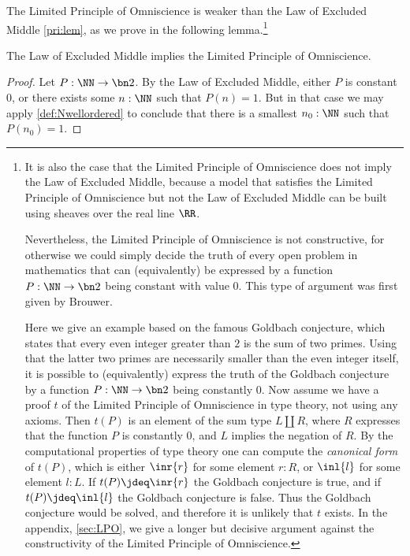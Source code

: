 The Limited Principle of Omniscience is weaker than the Law of Excluded Middle \cref{pri:lem}, as we prove in the following lemma.\footnote{%
  It is also the case that the Limited Principle of Omniscience does not imply the Law of Excluded Middle, because
  a model that satisfies the Limited Principle of Omniscience but not the Law of Excluded Middle can be built using sheaves over the real line $\RR$.

  Nevertheless, the Limited Principle of Omniscience is not constructive,
  for otherwise we could simply decide the truth of every open problem in mathematics
  that can (equivalently) be expressed by a function $P:\NN\to\bn 2$ being constant with value $0$.
  This type of argument was first given by Brouwer. %

  Here we give an example based on the famous Goldbach conjecture,
  which states that every even integer greater than $2$ is the sum of two primes. Using that
  the latter two primes are necessarily smaller than the even integer itself, it is possible
  to (equivalently) express the truth of the Goldbach conjecture by a function $P:\NN\to\bn 2$
  being constantly $0$. Now assume we have a proof $t$ of the Limited Principle of Omniscience
  in type theory, not using any axioms. Then $t(P)$ is an element of the
  sum type $L\amalg R$, where $R$ expresses that the function $P$ is constantly $0$,
  and $L$ implies the negation of $R$.
  By the computational properties of type theory one can compute the
  \emph{canonical form} of $t(P)$, which is either $\inr{r}$ for some element $r:R$,
  or $\inl{l}$ for some element $l:L$. If $t(P)\jdeq\inr{r}$ the Goldbach conjecture is true,
  and if $t(P)\jdeq\inl{l}$ the Goldbach conjecture is false. Thus the Goldbach conjecture
  would be solved, and therefore it is unlikely that $t$ exists.
  In the appendix, \ref{sec:LPO}, we give a longer but decisive argument against the constructivity of
  the Limited Principle of Omniscience.
}


\begin{lemma}
  The Law of Excluded Middle implies the Limited Principle of Omniscience.
\end{lemma}

\begin{proof}
  Let $P:\NN\to\bn 2$. By the Law of Excluded Middle, either $P$ is constant $0$,
  or there exists some $n:\NN$ such that $P(n)=1$.
  But in that case we may apply \cref{def:Nwellordered}
  to conclude that there is a smallest $n_0:\NN$ such that $P(n_0)=1$.
\end{proof}

